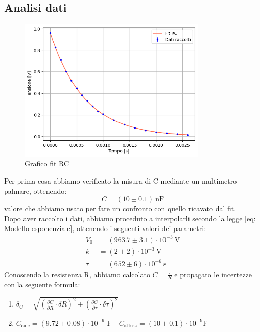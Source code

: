 \documentclass[letterpaper,12pt]{article}
\begin{document}
\subsection{Analisi dati}
\begin{figure}[h] 
  \centering
  \includegraphics[width=0.8\textwidth]{RC.png} %
  \caption{Grafico fit RC}
  \label{fig:fitRC}
\end{figure}
Per prima cosa abbiamo verificato la  misura  di C mediante un multimetro palmare, ottenendo: $$ C = (10 \pm 0.1)\ \text{nF}$$  valore che abbiamo usato per fare un confronto con quello ricavato dal fit.\\
Dopo aver raccolto i dati, abbiamo proceduto a interpolarli secondo la legge \eqref{eq: Modello esponenziale}, ottenendo i seguenti valori dei parametri:
\begin{align*}
    V_0 &= (963.7 \pm 3.1)\cdot 10^{-3}\ \text{V} \\
    k &= (2 \pm 2)\cdot 10^{-3}\ \text{V} \\
    \tau &= (652 \pm 6) \cdot 10^{-6}\ \text{s}
\end{align*}
Conoscendo la resistenza R, abbiamo calcolato $C = \frac{\tau}{R}$ e propagato le incertezze con la seguente formula:
\begin{enumerate}
    \item $\delta_\text{C} = \sqrt{(\frac{\partial C}{\partial R} \cdot \delta R)^2 + (\frac{\partial C}{\partial \tau}\cdot \delta \tau)^2} $
    \item $ C_\text{calc}= (9.72 \pm 0.08) \cdot 10^{-9} \text{ F} \quad C_\text{attesa}= (10 \pm 0.1) \cdot 10^{-9} \text{F}$
\end{enumerate}
\end{document}
